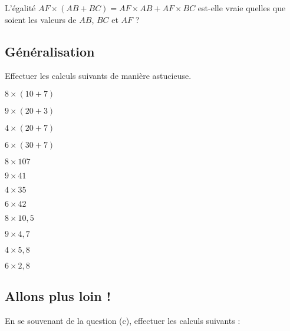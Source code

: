 \cnt L'égalité $AF\times (AB+BC)=AF\times AB+ AF\times BC$ est-elle vraie quelles que soient les valeurs de $AB$, $BC$ et $AF$ ?

\subsection*{Généralisation}

\cnt Effectuer les calculs suivants de manière astucieuse.

\begin{multicols}{4}
    $8\times (10+7)$

    $9\times (20+3)$

    $4\times (20+7)$

    $6\times (30+7)$
\end{multicols}

\begin{multicols}{4}
    $8\times 107$

    $9\times 41$

    $4\times 35$

    $6\times 42$
\end{multicols}

\begin{multicols}{4}
    $8\times 10,5$

    $9\times 4,7$

    $4\times 5,8$

    $6\times 2,8$
\end{multicols}

\subsection*{Allons plus loin !}

\cnt En se souvenant de la question (c), effectuer les calculs suivants :

